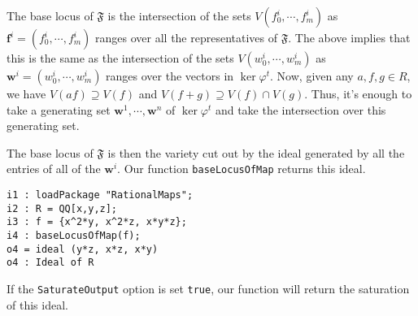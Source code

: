 \documentclass[11pt]{amsart}
\numberwithin{equation}{theorem}
\renewcommand{\:}{\colon}
\theoremstyle{theorem}
\begin{document}
The base locus of $\mathfrak{F}$ is the intersection of the sets $V(f^i_0, \cdots, f^i_m)$ as $\mathbf{f}^i = (f^i_0, \cdots, f^i_m)$ ranges over all the representatives of $\mathfrak{F}$. The above implies that this is the same as the intersection of the sets $V(w^i_0,\cdots, w^i_m)$ as $\mathbf{w}^i = (w^i_0, \cdots, w^i_m)$ ranges over the vectors in $\ker \varphi^t$. Now, given any $a, f, g\in R$, we have $V(af) \supseteq V(f)$ and $V(f + g) \supseteq V(f)\cap V(g)$. Thus, it's enough to take a generating set $\mathbf w^1, \cdots, \mathbf w^n$ of $\ker \varphi^t$  and take the intersection over this generating set.

The base locus of $\mathfrak{F}$ is then the variety cut out by the ideal generated by all the entries of all of the $\mathbf w^i$. Our function {\tt baseLocusOfMap}  returns this ideal.
{\scriptsize
\begin{verbatim}
i1 : loadPackage "RationalMaps";
i2 : R = QQ[x,y,z];
i3 : f = {x^2*y, x^2*z, x*y*z};
i4 : baseLocusOfMap(f);
o4 = ideal (y*z, x*z, x*y)
o4 : Ideal of R
\end{verbatim}
}
{\normalsize}
 If the \verb=SaturateOutput= option is set {\tt true}, our function will return the saturation of this ideal.
\end{document}
